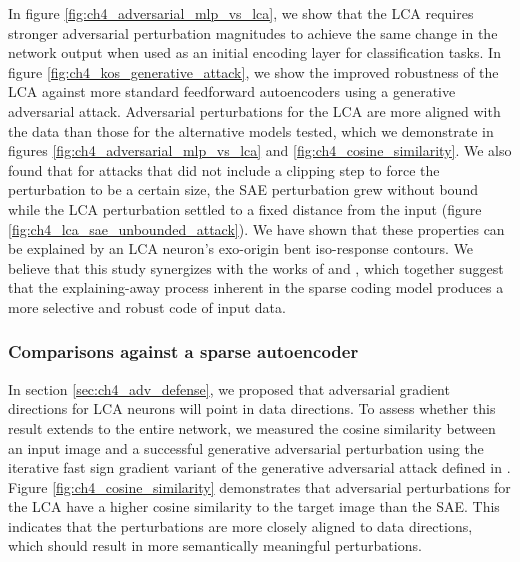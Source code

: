 In figure \ref{fig:ch4_adversarial_mlp_vs_lca}, we show that the LCA requires stronger adversarial perturbation magnitudes to achieve the same change in the network output when used as an initial encoding layer for classification tasks. In figure \ref{fig:ch4_kos_generative_attack}, we show the improved robustness of the LCA against more standard feedforward autoencoders using a generative adversarial attack. Adversarial perturbations for the LCA are more aligned with the data than those for the alternative models tested, which we demonstrate in figures \ref{fig:ch4_adversarial_mlp_vs_lca} and \ref{fig:ch4_cosine_similarity}. We also found that for attacks that did not include a clipping step to force the perturbation to be a certain size, the SAE perturbation grew without bound while the LCA perturbation settled to a fixed distance from the input (figure \ref{fig:ch4_lca_sae_unbounded_attack}). We have shown that these properties can be explained by an LCA neuron's exo-origin bent iso-response contours. We believe that this study synergizes with the works of \parencite{zhu2013visual} and \parencite{golden2016conjectures}, which together suggest that the explaining-away process inherent in the sparse coding model produces a more selective and robust code of input data.


\subsubsection{Comparisons against a sparse autoencoder}
In section \ref{sec:ch4_adv_defense}, we proposed that adversarial gradient directions for LCA neurons will point in data directions. To assess whether this result extends to the entire network, we measured the cosine similarity between an input image and a successful generative adversarial perturbation using the iterative fast sign gradient \parencite{kurakin2016adversarial} variant of the generative adversarial attack defined in \parencite{kos2018adversarial}. Figure \ref{fig:ch4_cosine_similarity} demonstrates that adversarial perturbations for the LCA have a higher cosine similarity to the target image than the SAE. This indicates that the perturbations are more closely aligned to data directions, which should result in more semantically meaningful perturbations.

